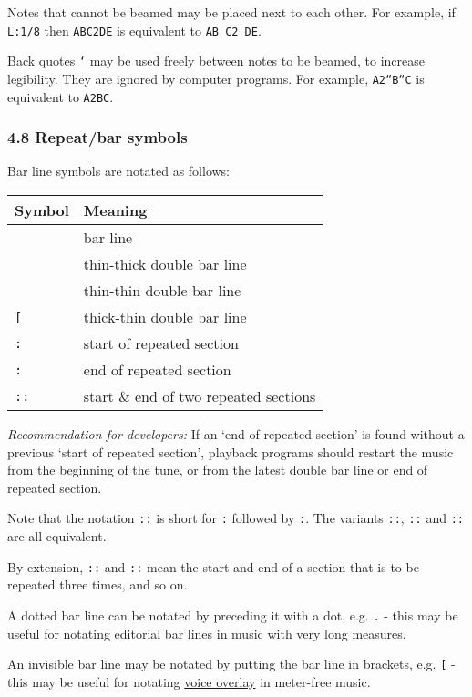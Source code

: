 Notes that cannot be beamed may be placed next to each other. For
example, if \texttt{L:1/8} then \texttt{ABC2DE} is equivalent to
\texttt{AB\ C2\ DE}.

Back quotes \texttt{`} may be used freely between notes to be beamed, to
increase legibility. They are ignored by computer programs. For example,
\texttt{A2``B``C} is equivalent to \texttt{A2BC}.

\hypertarget{repeat_bar_symbols}{\subsubsection{4.8 Repeat/bar
symbols}\label{repeat_bar_symbols}}

Bar line symbols are notated as follows:

\begin{longtable}[]{@{}ll@{}}
\toprule
\textbf{Symbol} & \textbf{Meaning}\tabularnewline
\midrule
\endhead
\texttt{\textbar{}} & bar line\tabularnewline
\texttt{\textbar{}{]}} & thin-thick double bar line\tabularnewline
\texttt{\textbar{}\textbar{}} & thin-thin double bar line\tabularnewline
\texttt{{[}\textbar{}} & thick-thin double bar line\tabularnewline
\texttt{\textbar{}:} & start of repeated section\tabularnewline
\texttt{:\textbar{}} & end of repeated section\tabularnewline
\texttt{::} & start \& end of two repeated sections\tabularnewline
\bottomrule
\end{longtable}

\emph{Recommendation for developers:} If an `end of repeated section' is
found without a previous `start of repeated section', playback programs
should restart the music from the beginning of the tune, or from the
latest double bar line or end of repeated section.

Note that the notation \texttt{::} is short for \texttt{:\textbar{}}
followed by \texttt{\textbar{}:}. The variants \texttt{::},
\texttt{:\textbar{}:} and \texttt{:\textbar{}\textbar{}:} are all
equivalent.

By extension, \texttt{\textbar{}::} and \texttt{::\textbar{}} mean the
start and end of a section that is to be repeated three times, and so
on.

A dotted bar line can be notated by preceding it with a dot, e.g.
\texttt{.\textbar{}} - this may be useful for notating editorial bar
lines in music with very long measures.

An invisible bar line may be notated by putting the bar line in
brackets, e.g. \texttt{{[}\textbar{}{]}} - this may be useful for
notating \protect\hyperlink{voice_overlay}{voice overlay} in meter-free
music.

